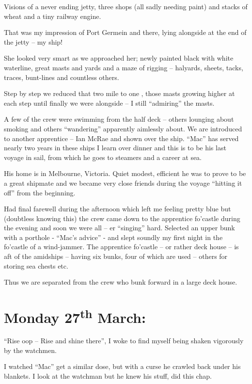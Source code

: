 \documentclass[
  11pt,
  msmallroyalvopaper
]{memoir}
\begin{document}
Visions of a never ending jetty, three shops (all sadly needing paint)
and stacks of wheat and a tiny railway engine.

That was my impression of Port Germein and there, lying alongside at the
end of the jetty -- my ship!

She looked very smart as we approached her; newly painted black with
white waterline, great masts and yards and a maze of rigging --
halyards, sheets, tacks, traces, bunt-lines and countless others.

Step by step we reduced that two mile to one , those masts growing
higher at each step until finally we were alongside -- I still
``admiring'' the masts.

A few of the crew were swimming from the half deck -- others lounging
about smoking and others ``wandering'' apparently aimlessly about. We
are introduced to another apprentice -- Ian McRae and shown over the
ship. ``Mac'' has served nearly two years in these ships I learn over
dinner and this is to be his last voyage in sail, from which he goes to
steamers and a career at sea.

His home is in Melbourne, Victoria. Quiet modest, efficient he was to
prove to be a great shipmate and we became very close friends during the
voyage ``hitting it off'' from the beginning.

Had final farewell during the afternoon which left me feeling pretty
blue but (doubtless knowing this) the crew came down to the apprentice
fo'castle during the evening and soon we were all -- er ``singing''
hard. Selected an upper bunk with a porthole - ``Mac's advice'' - and
slept soundly my first night in the fo'castle of a wind-jammer. The
apprentice fo'castle -- or rather deck house -- is aft of the amidships
-- having six bunks, four of which are used -- others for storing sea
chests etc.

Thus we are separated from the crew who bunk forward in a large deck
house.

\hypertarget{monday-27th-march}{%
\section{\texorpdfstring{Monday 27\textsuperscript{th}
March:}{Monday 27th March:}}\label{monday-27th-march}}

``Rise oop -- Rise and shine there'', I woke to find myself being shaken
vigorously by the watchmen.

I watched ``Mac'' get a similar dose, but with a curse he crawled back
under his blankets. I look at the watchman but he knew his stuff, did
this chap.
\end{document}
